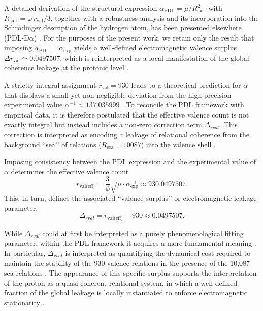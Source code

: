\documentclass[11pt,a4paper]{article}
\begin{document}
A detailed derivation of the structural expression
\(\alpha_{\text{PDL}} = \mu/R_{\text{surf}}^2\) with
\(R_{\text{surf}} = \varphi\, r_{\text{val}}/3\), together with a robustness
analysis and its incorporation into the Schrödinger description of the hydrogen
atom, has been presented elsewhere (PDL-D\(\alpha\)) \cite{Alpha_PDL_2026}.
For the purposes of the present work, we retain only the result that imposing
\(\alpha_{\text{PDL}} = \alpha_{\text{exp}}\) yields a well-defined
electromagnetic valence surplus
\(\Delta r_{\text{val}} \simeq 0.0497507\), which is reinterpreted as a local
manifestation of the global coherence leakage at the protonic level \cite{Alpha_PDL_2026}.

A strictly integral assignment $r_{\text{val}} = 930$ leads to a theoretical prediction for $\alpha$ that displays a small yet non-negligible deviation from the high-precision experimental value $\alpha^{-1} \approx 137.035999$ \cite{CODATA_2022}. To reconcile the PDL framework with empirical data, it is therefore postulated that the effective valence count is not exactly integral but instead includes a non-zero correction term $\Delta_{rval}$. This correction is interpreted as encoding a leakage of relational coherence from the background “sea’’ of relations ($R_{\text{sea}} = 10087$) into the valence shell \cite{Exponent_18_PDL_2026, Topological_Reformulation_PDL_2026}.

Imposing consistency between the PDL expression and the experimental value of $\alpha$ determines the effective valence count
\begin{equation}
    r_{\text{val(eff)}} = \frac{3}{\phi} \sqrt{\mu \cdot \alpha_{\text{exp}}^{-1}} \approx 930.0497507.
\end{equation}
This, in turn, defines the associated “valence surplus’’ or electromagnetic leakage parameter,
\begin{equation}
    \Delta_{rval} = r_{\text{val(eff)}} - 930 \approx 0.0497507.
\end{equation}

While $\Delta_{rval}$ could at first be interpreted as a purely phenomenological fitting parameter, within the PDL framework it acquires a more fundamental meaning \cite{Effective_Fields_PDL_2026}. In particular, $\Delta_{rval}$ is interpreted as quantifying the dynamical cost required to maintain the stability of the 930 valence relations in the presence of the 10,087 sea relations \cite{Combinatorial_Proton_v2_2026}. The appearance of this specific surplus supports the interpretation of the proton as a quasi-coherent relational system, in which a well-defined fraction of the global leakage is locally instantiated to enforce electromagnetic stationarity \cite{Effective_Fields_PDL_2026, Exponent_18_PDL_2026}.
\end{document}
